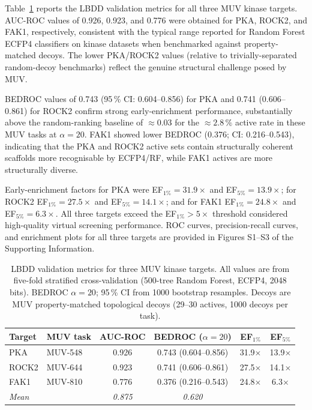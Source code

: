 \documentclass[journal=jcisd8,manuscript=article]{achemso}
\begin{document}
Table~\ref{tab:lbdd} reports the LBDD validation metrics for all three
MUV kinase targets.  AUC-ROC values of 0.926, 0.923, and 0.776 were obtained
for PKA, ROCK2, and FAK1, respectively, consistent with the typical
range reported for Random Forest ECFP4 classifiers on kinase
datasets\cite{svetnik2003random} when benchmarked against property-matched
decoys.  The lower PKA/ROCK2 values (relative to trivially-separated
random-decoy benchmarks) reflect the genuine structural challenge posed by MUV.

BEDROC values of 0.743 (95\,\% CI: 0.604--0.856) for PKA and
0.741 (0.606--0.861) for ROCK2 confirm strong early-enrichment performance,
substantially above the random-ranking baseline of $\approx 0.03$ for the
$\approx 2.8\,\%$ active rate in these MUV tasks at $\alpha = 20$.
FAK1 showed lower BEDROC (0.376; CI: 0.216--0.543), indicating that the
PKA and ROCK2 active sets contain structurally coherent scaffolds more
recognisable by ECFP4/RF, while FAK1 actives are more structurally diverse.

Early-enrichment factors for PKA were
EF$_{1\%} = 31.9\times$ and EF$_{5\%} = 13.9\times$;
for ROCK2 EF$_{1\%} = 27.5\times$ and EF$_{5\%} = 14.1\times$;
and for FAK1 EF$_{1\%} = 24.8\times$ and EF$_{5\%} = 6.3\times$.
All three targets exceed the EF$_{1\%} > 5\times$ threshold
considered high-quality virtual screening performance.\cite{truchon2007evaluating}
ROC curves, precision-recall curves, and enrichment plots for all
three targets are provided in Figures S1--S3 of the Supporting Information.

\begin{table}[htbp]
  \centering
  \caption{LBDD validation metrics for three MUV kinase targets.
           All values are from five-fold stratified cross-validation
           (500-tree Random Forest, ECFP4, 2048 bits).
           BEDROC $\alpha = 20$; 95\,\% CI from 1000 bootstrap resamples.
           Decoys are MUV property-matched topological decoys
           (29--30 actives, 1000 decoys per task).}
  \label{tab:lbdd}
  \begin{tabular}{llcccc}
    \toprule
    Target & MUV task &
    AUC-ROC &
    BEDROC ($\alpha=20$) &
    EF$_{1\%}$ &
    EF$_{5\%}$ \\
    \midrule
    PKA   & MUV-548 &
      0.926 &
      0.743 (0.604--0.856) &
      31.9$\times$ &
      13.9$\times$ \\
    ROCK2 & MUV-644 &
      0.923 &
      0.741 (0.606--0.861) &
      27.5$\times$ &
      14.1$\times$ \\
    FAK1  & MUV-810 &
      0.776 &
      0.376 (0.216--0.543) &
      24.8$\times$ &
      6.3$\times$ \\
    \midrule
    \textit{Mean} & &
      \textit{0.875} &
      \textit{0.620} & & \\
    \bottomrule
  \end{tabular}
\end{table}
\end{document}
